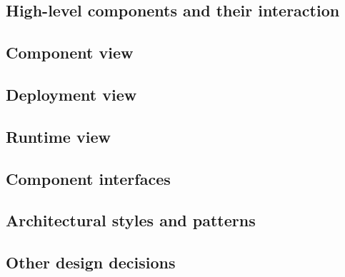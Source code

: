 \subsection{High-level components and their interaction}

\subsection{Component view}

\subsection{Deployment view}

\subsection{Runtime view}

\subsection{Component interfaces}

\subsection{Architectural styles and patterns}

\subsection{Other design decisions}

